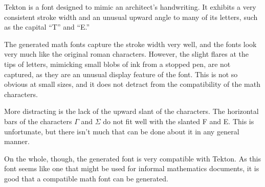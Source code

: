 
Tekton is a font designed to mimic an architect's handwriting. It exhibits a
very consistent stroke width and an unusual upward angle to many of its letters,
such as the capital ``T'' and ``E.''

The generated math fonts capture the stroke width very well, and the fonts look
very much like the original roman characters. However, the slight flares at the
tips of letters, mimicking small blobs of ink from a stopped pen, are not
captured, as they are an unusual display feature of the font. This is not so
obvious at small sizes, and it does not detract from the compatibility of the
math characters.

More distracting is the lack of the upward slant of the characters. The
horizontal bars of the characters $\Gamma$ and $\Sigma$ do not fit well with the
slanted F and E. This is unfortunate, but there isn't much that can be done
about it in any general manner.

On the whole, though, the generated font is very compatible with Tekton. As this
font seems like one that might be used for informal mathematics documents, it is
good that a compatible math font can be generated.
